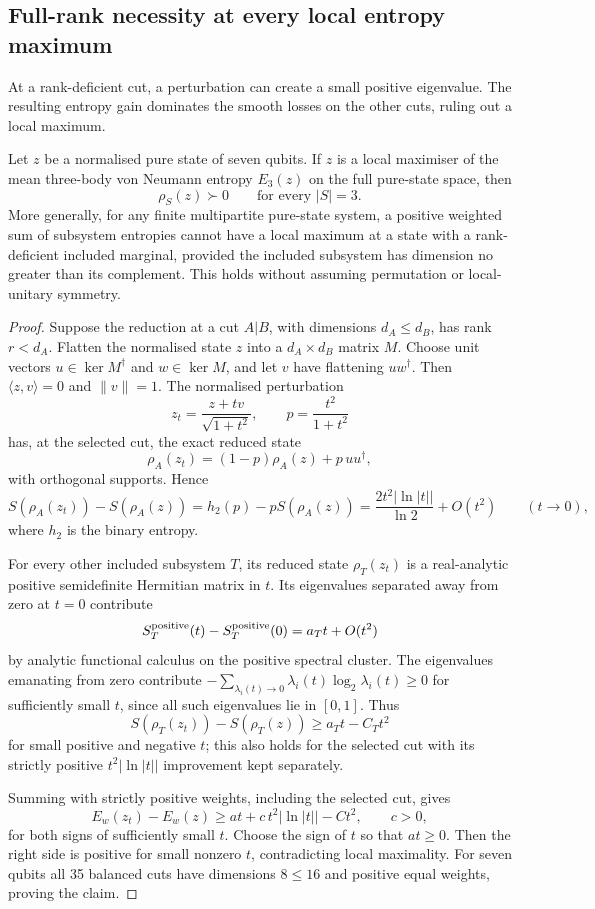 \subsection{Full-rank necessity at every local entropy maximum}
\label{sec:seven-entropy-fullrank}
At a rank-deficient cut, a perturbation can create a small positive eigenvalue. The resulting entropy gain
dominates the smooth losses on the other cuts, ruling out a local maximum.

\begin{proposition}
\label{prop:seven-entropy-full-rank}
Let \(z\) be a normalised pure state of seven qubits. If \(z\)
is a local maximiser of the mean three-body von Neumann entropy
\(E_3(z)\) on the full pure-state space, then
\[
                  \rho_S(z)\succ0
                  \qquad\text{for every }|S|=3.
\]
More generally, for any finite multipartite pure-state system,
a positive weighted sum of subsystem entropies cannot have a
local maximum at a state with a rank-deficient included marginal,
provided the included subsystem has dimension no greater than
its complement. This holds without assuming permutation or
local-unitary symmetry.
\end{proposition}
\begin{proof}
Suppose the reduction at a cut \(A|B\), with dimensions
\(d_A\le d_B\), has rank \(r<d_A\). Flatten the normalised
state \(z\) into a \(d_A\times d_B\) matrix \(M\). Choose unit
vectors \(u\in\ker M^\dagger\) and \(w\in\ker M\), and let
\(v\) have flattening \(u w^\dagger\). Then
\(\langle z,v\rangle=0\) and \(\|v\|=1\).
The normalised perturbation
\[
 z_t=\frac{z+t v}{\sqrt{1+t^2}},\qquad
 p=\frac{t^2}{1+t^2}
\]
has, at the selected cut, the exact reduced state
\[
 \rho_A(z_t)=(1-p)\rho_A(z)+p\,uu^\dagger,
\]
with orthogonal supports. Hence
\[
 S(\rho_A(z_t))-S(\rho_A(z))
   =h_2(p)-pS(\rho_A(z))
   =\frac{2t^2|\ln|t||}{\ln2}+O(t^2)
   \qquad(t\longrightarrow0),
\]
where \(h_2\) is the binary entropy.

For every other included subsystem \(T\), its reduced state
\(\rho_T(z_t)\) is a real-analytic positive semidefinite
Hermitian matrix in \(t\). Its eigenvalues separated away from
zero at \(t=0\) contribute
\[
 S_T^{\rm positive}(t)-S_T^{\rm positive}(0)
       =a_T t+O(t^2)
\]
by analytic functional calculus on the positive spectral
cluster. The eigenvalues emanating from zero contribute
\(-\sum_{\lambda_i(t)\to0}\lambda_i(t)\log_2\lambda_i(t)
\ge0\) for sufficiently small \(t\), since all such
eigenvalues lie in \([0,1]\). Thus
\[
 S(\rho_T(z_t))-S(\rho_T(z))
       \ge a_Tt-C_Tt^2
\]
for small positive and negative \(t\); this also holds for
the selected cut with its strictly positive
\(t^2|\ln|t||\) improvement kept separately.

Summing with strictly positive weights, including the
selected cut, gives
\[
 E_w(z_t)-E_w(z)
 \ge at+c\,t^2|\ln|t||-Ct^2,\qquad c>0,
\]
for both signs of sufficiently small \(t\).
Choose the sign of \(t\) so that \(at\ge0\).
Then the right side is positive for small nonzero \(t\),
contradicting local maximality.
For seven qubits all 35 balanced cuts have dimensions
\(8\le16\) and positive equal weights, proving the claim.
\end{proof}

